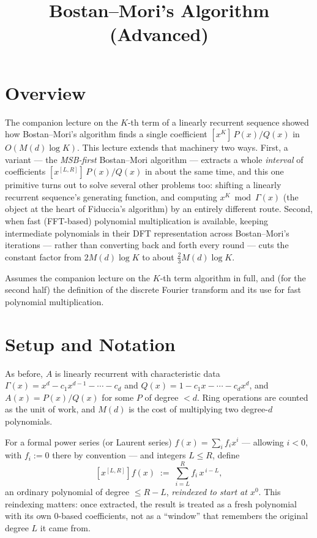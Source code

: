 \documentclass[11pt]{article}
\title{Bostan--Mori's Algorithm (Advanced)}
\author{}
\date{}
\begin{document}
\thispagestyle{fancy}


\section{Overview}
The companion lecture on the $K$-th term of a linearly recurrent sequence
showed how Bostan--Mori's algorithm finds a single coefficient
$[x^K]\,P(x)/Q(x)$ in $O(M(d)\log K)$. This lecture extends that
machinery two ways. First, a variant --- the \emph{MSB-first} Bostan--Mori
algorithm --- extracts a whole \emph{interval} of coefficients
$[x^{[L,R]}]\,P(x)/Q(x)$ in about the same time, and this one primitive
turns out to solve several other problems too: shifting a linearly
recurrent sequence's generating function, and computing
$x^K \bmod \Gamma(x)$ (the object at the heart of Fiduccia's algorithm) by
an entirely different route. Second, when fast (FFT-based) polynomial
multiplication is available, keeping intermediate polynomials in their
DFT representation across Bostan--Mori's iterations --- rather than
converting back and forth every round --- cuts the constant factor from
$2M(d)\log K$ to about $\tfrac23 M(d)\log K$.

Assumes the companion lecture on the $K$-th term algorithm in full, and
(for the second half) the definition of the discrete Fourier transform
and its use for fast polynomial multiplication.

\section{Setup and Notation}
As before, $A$ is linearly recurrent with characteristic data
$\Gamma(x)=x^d-c_1x^{d-1}-\cdots-c_d$ and
$Q(x)=1-c_1x-\cdots-c_dx^d$, and $A(x)=P(x)/Q(x)$ for some $P$ of degree
$<d$. Ring operations are counted as the unit of work, and $M(d)$ is the
cost of multiplying two degree-$d$ polynomials.

\begin{definitionbox}
For a formal power series (or Laurent series) $f(x)=\sum_i f_i x^i$
--- allowing $i<0$, with $f_i:=0$ there by convention --- and integers
$L\le R$, define
\[
  [x^{[L,R]}]f(x) \;:=\; \sum_{i=L}^{R} f_i\, x^{\,i-L},
\]
an ordinary polynomial of degree $\le R-L$, \emph{reindexed to start at
$x^0$}. This reindexing matters: once extracted, the result is treated as
a fresh polynomial with its own $0$-based coefficients, not as a
``window'' that remembers the original degree $L$ it came from.
\end{definitionbox}
\end{document}

